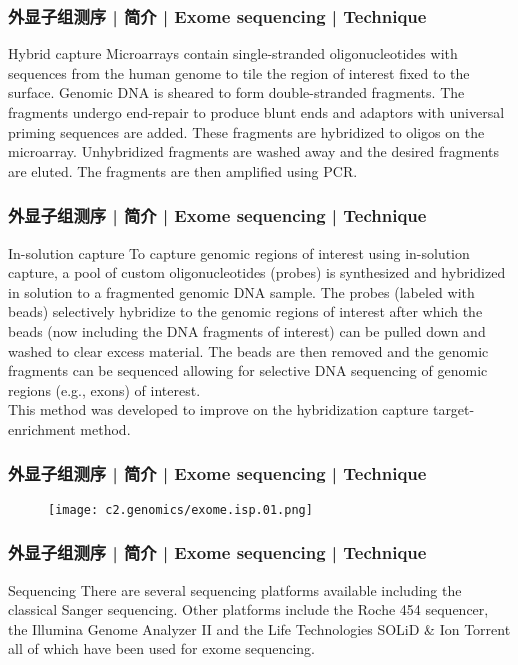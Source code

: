 \begin{frame}
  \frametitle{外显子组测序 | 简介 | Exome sequencing | Technique}
  \begin{block}{Hybrid capture}
    Microarrays contain single-stranded oligonucleotides with sequences from the human genome to tile the region of interest fixed to the surface. Genomic DNA is sheared to form double-stranded fragments. The fragments undergo end-repair to produce blunt ends and adaptors with universal priming sequences are added. These fragments are hybridized to oligos on the microarray. Unhybridized fragments are washed away and the desired fragments are eluted. The fragments are then amplified using PCR.
  \end{block}
\end{frame}

\begin{frame}
  \frametitle{外显子组测序 | 简介 | Exome sequencing | Technique}
  \begin{block}{In-solution capture}
 To capture genomic regions of interest using in-solution capture, a pool of custom oligonucleotides (probes) is synthesized and hybridized in solution to a fragmented genomic DNA sample. The probes (labeled with beads) selectively hybridize to the genomic regions of interest after which the beads (now including the DNA fragments of interest) can be pulled down and washed to clear excess material. The beads are then removed and the genomic fragments can be sequenced allowing for selective DNA sequencing of genomic regions (e.g., exons) of interest.\\
 \vspace{1em}
 This method was developed to improve on the hybridization capture target-enrichment method.
  \end{block}
\end{frame}

\begin{frame}
  \frametitle{外显子组测序 | 简介 | Exome sequencing | Technique}
  \begin{figure}
    \centering
    \texttt{[image: c2.genomics/exome.isp.01.png]}
  \end{figure}
\end{frame}

\begin{frame}
  \frametitle{外显子组测序 | 简介 | Exome sequencing | Technique}
  \begin{block}{Sequencing}
 There are several sequencing platforms available including the classical Sanger sequencing. Other platforms include the Roche 454 sequencer, the Illumina Genome Analyzer II and the Life Technologies SOLiD \& Ion Torrent all of which have been used for exome sequencing.
  \end{block}
\end{frame}

